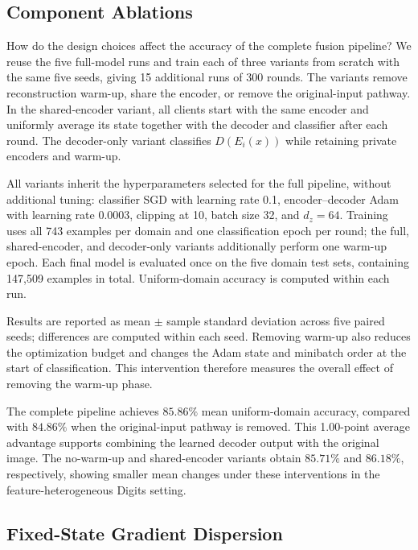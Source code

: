 

\subsection{Component Ablations}
\label{app:digits_ablation}

How do the design choices affect the accuracy of the complete fusion
pipeline? We reuse the five full-model runs and train each of three variants
from scratch with the same five seeds, giving 15 additional runs of
300 rounds. The variants remove reconstruction warm-up, share the encoder,
or remove the original-input pathway. In the shared-encoder variant, all
clients start with the same encoder and uniformly average its state together
with the decoder and classifier after each round. The decoder-only variant
classifies $D(E_i(x))$ while retaining private encoders and warm-up.

All variants inherit the hyperparameters selected for the full pipeline,
without additional tuning: classifier SGD with learning rate 0.1,
encoder--decoder Adam with learning rate 0.0003, clipping at 10, batch size
32, and $d_z=64$. Training uses all 743 examples per domain and one
classification epoch per round; the full, shared-encoder, and decoder-only
variants additionally perform one warm-up epoch. Each final model is
evaluated once on the five domain test sets, containing 147,509 examples
in total. Uniform-domain accuracy is computed within each run.



Results are reported as mean $\pm$ sample standard deviation across five
paired seeds; differences are computed within each seed.
Removing warm-up also reduces the optimization budget and changes the Adam
state and minibatch order at the start of classification. This intervention
therefore measures the overall effect of removing the warm-up phase.

The complete pipeline achieves $85.86\%$ mean uniform-domain accuracy,
compared with $84.86\%$ when the original-input pathway is removed.
This 1.00-point average advantage supports combining the learned decoder
output with the original image. The no-warm-up and shared-encoder variants
obtain $85.71\%$ and $86.18\%$, respectively, showing smaller mean changes
under these interventions in the feature-heterogeneous Digits setting.

\subsection{Fixed-State Gradient Dispersion}
\label{app:digits_gradients}

